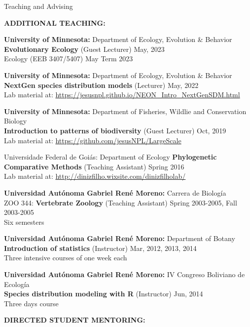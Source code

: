 \documentclass{resume} %
\begin{document}
\begin{rSection}{Teaching and Advising}

\textbf{ADDITIONAL TEACHING:}

{\bf University of Minnesota: }{Department of Ecology, Evolution \& Behavior } \\
\textbf{Evolutionary Ecology} (Guest Lecturer) \hfill May, 2023 \\
{Ecology (EEB 3407/5407) May Term 2023}\smallskip 

{\bf University of Minnesota: }{Department of Ecology, Evolution \& Behavior } \\
\textbf{NextGen species distribution models} (Lecturer) \hfill May, 2022 \\
{Lab material at:
\url{https://jesusnpl.github.io/NEON_Intro_NextGenSDM.html}}\smallskip 

{\bf University of Minnesota: }{Department of Fisheries, Wildlie and Conservation Biology } \\
\textbf{Introduction to patterns of biodiversity} (Guest Lecturer) \hfill Oct, 2019 \\
{Lab material at:
\url{https://github.com/jesusNPL/LargeScale}}\smallskip 

\begin{reSubsection}{Universidade Federal de Goiás: }{Department of Ecology }{}{
\textbf{Phylogenetic Comparative Methods} (Teaching Assistant) \hfill Spring 2016 \\ 
{Lab material at:
\url{http://dinizfilho.wixsite.com/dinizfilholab/}} \smallskip 
} 
\end{reSubsection}

{\bf Universidad Autónoma Gabriel René Moreno: }{Carrera de Biología } \\
ZOO 344: \textbf{Vertebrate Zoology} (Teaching Assistant) \hfill Spring 2003-2005, Fall 2003-2005 \\
{Six semesters}\smallskip 

{\bf Universidad Autónoma Gabriel René Moreno: }{Department of Botany } \\
\textbf{Introduction of statistics} (Instructor) \hfill Mar, 2012, 2013, 2014 \\
{Three intensive courses of one week each}\smallskip 

{\bf Universidad Autónoma Gabriel René Moreno: }{IV Congreso Boliviano de Ecología } \\
\textbf{Species distribution modeling with R} (Instructor) \hfill Jun, 2014 \\
{Three days course}\smallskip 

\textbf{DIRECTED STUDENT MENTORING:}


\end{rSection}
\end{document}
